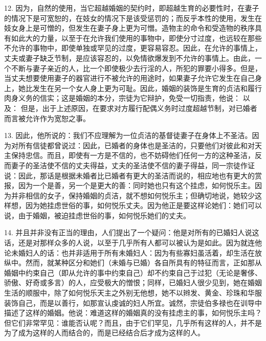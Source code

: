 12. 因为，自然的使用，当它超越婚姻的契约时，即超越生育的必要性时，在妻子的情况下是可宽恕的，在妓女的情况下是该受惩罚的；而反乎本性的使用，发生在妓女身上是可憎的，但发生在妻子身上更为可憎。造物主的命令和受造物的秩序具有如此大的力量，以至于在允许我们使用的事物中，即使分寸过度，也远较在那些不允许的事物中，即使单独或罕见的过度，更容易容忍。因此，在允许的事情上，丈夫或妻子缺乏节制，是应该容忍的，以免情欲爆发到不允许的事情上。由此，一个不断与妻子亲近的人，比一个即使极少去行淫的人，所犯的罪要小得多。但是，当丈夫想要使用妻子的器官进行不被允许的用途时，如果妻子允许它发生在自己身上，她比发生在另一个女人身上更为可耻。因此，婚姻的装饰是生育的贞洁和履行肉身义务的信实；这是婚姻的本分，宗徒为它辩护，免受一切指责，他说： 以及： 但是，出于上述原因，在要求对方履行配偶义务时过度超越节制，对已婚者而言被允许作为宽恕之事。\par

13. 因此，他所说的：我们不应理解为一位贞洁的基督徒妻子在身体上不圣洁。因为对所有信徒都曾说过：因此，已婚者的身体也是圣洁的，只要他们对彼此和对天主保持忠信。而且，即使有一方是不信的，也不妨碍他们任何一方的这种圣洁，反而妻子的圣洁使不信的丈夫得益，丈夫的圣洁使不信的妻子得益，同一宗徒作证说：因此，那话是根据未婚者比已婚者有更大的圣洁而说的，相应地也有更大的赏报，因为一个是善，另一个是更大的善：同时她也只有这个挂虑，如何悦乐主。因为并非相信的女子，保持婚姻的贞洁，就不想如何悦乐主；但确切地说，她较少这样想，因为她挂虑世俗的事，如何悦乐丈夫。因为他正是要这样论她们：她们可以说，由于婚姻，被迫挂虑世俗的事，如何悦乐她们的丈夫。\par

14. 并且并非没有正当的理由，人们提出了一个疑问：他是对所有的已婚妇人说这话，还是对那样众多的人说，以至于几乎所有人都可以被认为是如此。因为就连他论未婚妇人的话：也并非适用于所有未婚妇人：因为有些寡妇虽活着，却生活在放纵中。然而，就某种区分和她们（未婚与已婚）各自所具有的特征而言，正如那从婚姻中约束自己（即从允许的事中约束自己）却不约束自己于过犯（无论是奢侈、骄傲、好奇或多言）的人，应受极大的憎恨；同样，已婚妇人很少见到，她在婚姻生活的顺服中，除了如何悦乐天主之外别无他想，她不以辫发、黄金、珍珠和华服装饰自己，而是以善行，如那宣认虔诚的妇人所宜。诚然，宗徒伯多禄也在训导中描述了这样的婚姻。他说：难道这样的婚姻真的没有挂虑主的事，如何悦乐主吗？但它们非常罕见：谁能否认呢？而且，由于它们罕见，几乎所有这样的人，并不是为了成为这样的人而结合的，而是已经结合后才成为这样的人。\par

